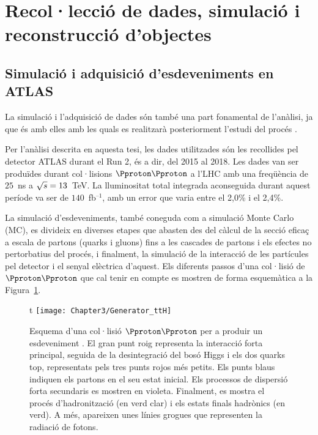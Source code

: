 \FloatBarrier
\section{Recol·lecció de dades, simulació i reconstrucció d'objectes}
\label{chap:resumen_val:Dades_i_Reco}
\subsection{Simulació i adquisició d'esdeveniments en ATLAS}
La simulació i l'adquisició de dades són també una part fonamental de l'anàlisi, ja que 
és amb elles amb les quals es realitzarà posteriorment l'estudi del procés \tHq.

Per l'anàlisi descrita en aquesta tesi, les dades utilitzades són les recollides pel detector ATLAS 
durant el Run 2, és a dir, del 2015 al 2018. Les dades van ser produïdes durant col·lisions $\Pproton \Pproton$  
a l'LHC amb una freqüència de $25$~ns a $\sqrt{s}=13$~TeV. La lluminositat total integrada aconseguida 
durant aquest període va ser de $140$~fb$^{–1}$, amb un error que varia entre el 2,0\% i el 2,4\%.

La simulació d'esdeveniments, també coneguda com a simulació Monte Carlo (MC), es divideix en 
diverses etapes que abasten des del càlcul de la secció eficaç a escala de partons (quarks i gluons) 
fins a les cascades de partons i els efectes no pertorbatius del procés, i finalment, la simulació de la 
interacció de les partícules pel detector i el senyal elèctrica d'aquest. Els diferents passos 
d'una col·lisió de $\Pproton\Pproton$ que cal tenir en compte es mostren de forma esquemàtica 
a la Figura~\ref{fig:Resum:ttHSimulated}.


 \begin{figure}{t}
    \centering
    \texttt{[image: Chapter3/Generator\_ttH]}
    \caption{Esquema d'una col·lisió $\Pproton \Pproton$ per a produir un esdeveniment \ttH.  
    El gran punt roig representa la interacció forta principal, seguida de la desintegració del bosó Higgs i els dos quarks top, 
    representats pels tres punts rojos més petits.  Els punts blaus indiquen els partons en el seu estat inicial. Els processos de dispersió forta secundaris es mostren en violeta. Finalment, es mostra el procés d'hadronització (en verd clar) i els estats finals hadrònics (en verd). A més, apareixen unes línies grogues que representen la radiació de fotons. }
    \label{fig:Resum:ttHSimulated}
\end{figure}

